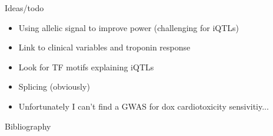 \documentclass{beamer}
\begin{document}
\begin{frame}{Ideas/todo}
\begin{itemize}
\item Using allelic signal to improve power (challenging for iQTLs)
\item Link to clinical variables and troponin response
\item Look for TF motifs explaining iQTLs
\item Splicing (obviously)
\item Unfortunately I can't find a GWAS for dox cardiotoxicity sensivitiy...
\end{itemize}
\end{frame}

\begin{frame}[allowframebreaks]{Bibliography}
\small
\def\newblock{}


\end{frame}
\end{document}
